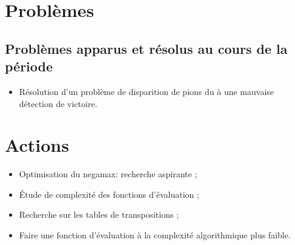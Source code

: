 \documentclass[a4paper]{article}
\begin{document}
\section*{Problèmes}		
	\subsection*{Problèmes apparus et résolus au cours de la période}
		\begin{itemize}
			\item Résolution d'un problème de disparition de pions du à une mauvaise détection de victoire.
		\end{itemize}

\section*{Actions}
	\begin{itemize}
		\item Optimisation du negamax: recherche aspirante ;
		\item \'Etude de complexité des fonctions d'évaluation ;
		\item Recherche sur les tables de transpositions ;
		\item Faire une fonction d'évaluation à la complexité algorithmique plus faible.
	\end{itemize}
\end{document}

